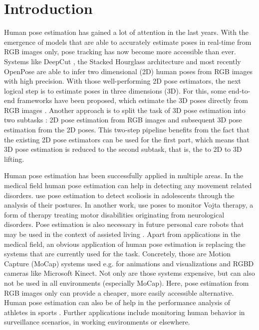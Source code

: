 \section{Introduction}

Human pose estimation has gained a lot of attention in the last years.
With the emergence of models that are able to accurately estimate poses in real-time from RGB images only, pose tracking has now become more accessible than ever.
Systems like DeepCut \cite{pishchulin16}, the Stacked Hourglass architecture \cite{newell16} and most recently OpenPose \cite{cao18} are able to infer two dimensional (2D) human poses from RGB images with high precision.
With those well-performing 2D pose estimators, the next logical step is to estimate poses in three dimensions (3D).
For this, some end-to-end frameworks have been proposed, which estimate the 3D poses directly from RGB images \cite{pavlakos17, park16, mehta17, mehta17_2}.
Another approach is to split the task of 3D pose estimation into two subtasks \cite{drover18, martinez17, moreno-noguer16}:
2D pose estimation from RGB images and subsequent 3D pose estimation from the 2D poses.
This two-step pipeline benefits from the fact that the existing 2D pose estimators can be used for the first part, which means that 3D pose estimation is reduced to the second subtask, that is, the to 2D to 3D lifting.

Human pose estimation has been successfully applied in multiple areas.
In the medical field human pose estimation can help in detecting any movement related disorders.
\citet{aroeira16} use pose estimation to detect scoliosis in adolescents through the analysis of their postures.
In another work, \citet{khan18} use poses to monitor Vojta therapy, a form of therapy treating motor disabilities originating from neurological disorders.
Pose estimation is also necessary in future personal care robots that may be used in the context of assisted living \cite{richter15}.
Apart from applications in the medical field, an obvious application of human pose estimation is replacing the systems that are currently used for the task.
Concretely, those are Motion Capture (MoCap) systems used e.g. for animations and visualizations and RGBD cameras like Microsoft Kinect.
Not only are those systems expensive, but can also not be used in all environments (especially MoCap).
Here, pose estimation from RGB images only can provide a cheaper, more easily accessible alternative.
Human pose estimation can also be of help in the performance analysis of athletes in sports \cite{einfalt18, zecha19}.
Further applications include monitoring human behavior in surveillance scenarios, in working environments or elsewhere.

